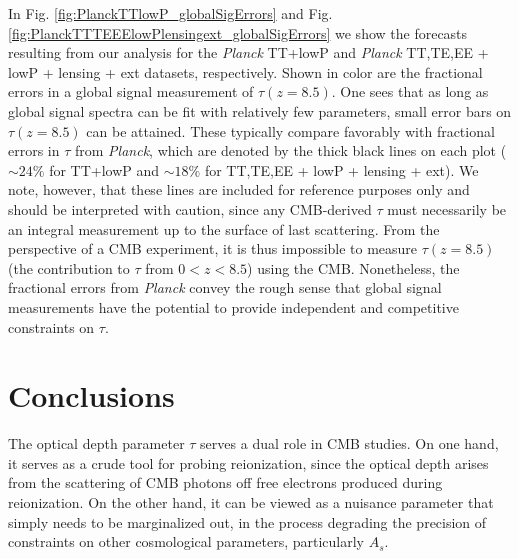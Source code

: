 \documentclass[twocolumn,aps,prd,nofootinbib,showpacs]{revtex4-1}
\begin{document}
In Fig. \ref{fig:PlanckTTlowP_globalSigErrors} and Fig. \ref{fig:PlanckTTTEEElowPlensingext_globalSigErrors} we show the forecasts resulting from our analysis for the \emph{Planck} TT+lowP and \emph{Planck} TT,TE,EE + lowP + lensing + ext  datasets, respectively. Shown in color are the fractional errors in a global signal measurement of $\tau (z=8.5)$. One sees that as long as global signal spectra can be fit with relatively few parameters, small error bars on $\tau(z = 8.5)$ can be attained. These typically compare favorably with fractional errors in $\tau$ from \emph{Planck}, which are denoted by the thick black lines on each plot ($\sim 24\%$ for TT+lowP and $\sim 18\%$ for TT,TE,EE + lowP + lensing + ext). We note, however, that these lines are included for reference purposes only and should be interpreted with caution, since any CMB-derived $\tau$ must necessarily be an integral measurement up to the surface of last scattering. From the perspective of a CMB experiment, it is thus impossible to measure $\tau (z=8.5)$ (the contribution to $\tau$ from $0 < z < 8.5$) using the CMB. Nonetheless, the fractional errors from \emph{Planck} convey the rough sense that global signal measurements have the potential to provide independent and competitive constraints on $\tau$.


\section{Conclusions}
\label{sec:conc}

The optical depth parameter $\tau$ serves a dual role in CMB studies. On one hand, it serves as a crude tool for probing reionization, since the optical depth arises from the scattering of CMB photons off free electrons produced during reionization. On the other hand, it can be viewed as a nuisance parameter that simply needs to be marginalized out, in the process degrading the precision of constraints on other cosmological parameters, particularly $A_s$.
\end{document}
